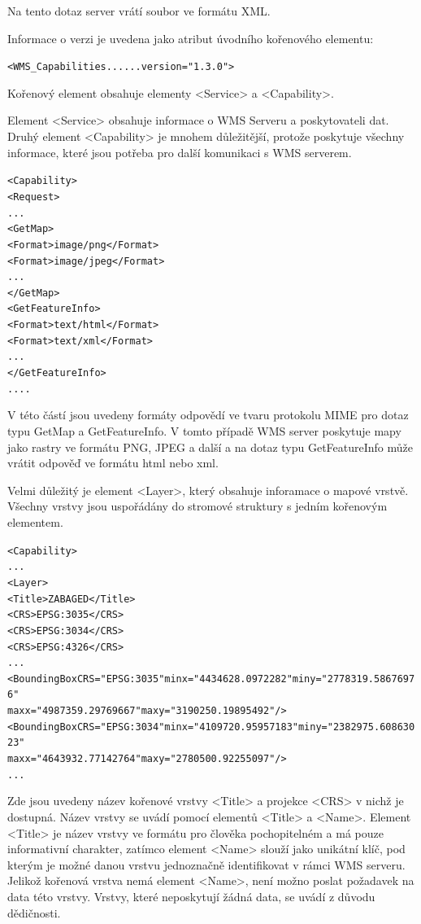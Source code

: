 \documentclass[a4paper,12pt]{article}
\begin{document}
Na tento dotaz server vrátí soubor ve formátu XML. 

Informace o verzi je uvedena jako atribut úvodního kořenového elementu:
\begin{alltt}\footnotesize
<WMS_Capabilities...    ...version="1.3.0">
\end{alltt}

Kořenový element obsahuje elementy <Service> a <Capability>.

Element  <Service> obsahuje informace o WMS Serveru a poskytovateli dat.
Druhý element <Capability> je mnohem důležitější, protože poskytuje všechny informace, které jsou potřeba pro další komunikaci s WMS serverem.

\begin{alltt}\footnotesize
<Capability>
    <Request>
          ...
       <GetMap>
            <Format>image/png</Format>
            <Format>image/jpeg</Format>
          ...
       </GetMap>	
       <GetFeatureInfo>
            <Format>text/html</Format>
            <Format>text/xml</Format>
              ...
       </GetFeatureInfo>
           ....
\end{alltt}
V této částí jsou uvedeny formáty odpovědí ve tvaru protokolu MIME pro dotaz typu GetMap a GetFeatureInfo. V tomto případě WMS server poskytuje  mapy jako rastry ve formátu PNG, JPEG a další a na 
dotaz typu GetFeatureInfo může vrátit odpověď ve formátu html nebo xml.  

Velmi důležitý je element <Layer>, který obsahuje inforamace o mapové vrstvě. Všechny vrstvy jsou uspořádány do stromové struktury s jedním kořenovým elementem.

\begin{alltt}\footnotesize
<Capability>
    ...
  <Layer>
   <Title>ZABAGED</Title>
     <CRS>EPSG:3035</CRS>
     <CRS>EPSG:3034</CRS>
     <CRS>EPSG:4326</CRS>
      ...
     <BoundingBox CRS="EPSG:3035" minx="4434628.0972282" miny="2778319.58676976"
                                  maxx="4987359.29769667" maxy="3190250.19895492"/>
     <BoundingBox CRS="EPSG:3034" minx="4109720.95957183" miny="2382975.60863023"
                                  maxx="4643932.77142764" maxy="2780500.92255097"/>
      ...
\end{alltt}

Zde jsou uvedeny název kořenové vrstvy <Title> a projekce <CRS> v nichž je dostupná. Název vrstvy se uvádí pomocí elementů <Title> a <Name>. Element
<Title> je název vrstvy ve formátu pro člověka pochopitelném a má pouze informativní charakter, zatímco element <Name> slouží jako unikátní klíč, 
pod kterým je možné danou vrstvu jednoznačně identifikovat v rámci WMS serveru. Jelikož kořenová vrstva nemá element <Name>, není možno poslat požadavek na data této vrstvy. Vrstvy, které neposkytují 
žádná data, se uvádí z důvodu dědičnosti. 
\end{document}
